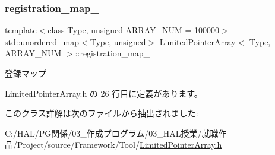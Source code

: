 \mbox{\label{class_limited_pointer_array_a4f3ca120f5fc23ee3db798cb701d61a0}} 
\subsubsection{\texorpdfstring{registration\+\_\+map\+\_\+}{registration\_map\_}}
{\footnotesize\ttfamily template$<$class Type, unsigned A\+R\+R\+A\+Y\+\_\+\+N\+UM = 100000$>$ \\
std\+::unordered\+\_\+map$<$Type, unsigned$>$ \mbox{\hyperlink{class_limited_pointer_array}{Limited\+Pointer\+Array}}$<$ Type, A\+R\+R\+A\+Y\+\_\+\+N\+UM $>$\+::registration\+\_\+map\+\_\+\hspace{0.3cm}{\ttfamily [private]}}



登録マップ 



 Limited\+Pointer\+Array.\+h の 26 行目に定義があります。



このクラス詳解は次のファイルから抽出されました\+:\begin{DoxyCompactItemize}
\item 
C\+:/\+H\+A\+L/\+P\+G関係/03\+\_\+作成プログラム/03\+\_\+\+H\+A\+L授業/就職作品/\+Project/source/\+Framework/\+Tool/\mbox{\hyperlink{_limited_pointer_array_8h}{Limited\+Pointer\+Array.\+h}}\end{DoxyCompactItemize}
